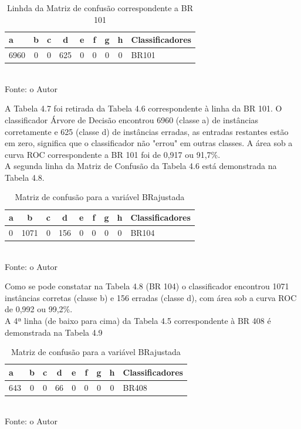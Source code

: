 \begin{table}[!ht]
	\centering
	\caption{Linhda da Matriz de confusão correspondente a BR 101}
	\vspace{1mm}
	\begin{tabular}{l|c|c|c|c|c|c|c|l}
		\hline
		\textbf{a} & \textbf{b} & \textbf{c} & \textbf{d} & \textbf{e} & \textbf{f} & \textbf{g} & \textbf{h} & \textbf{Classificadores}\\
		\hline
		6960 & 0 & 0 & 625 & 0 & 0 & 0 & 0 & BR101 \\
	\end{tabular}
	\\
	\tiny Fonte: o Autor
\end{table}

A Tabela 4.7 foi retirada da Tabela 4.6 correspondente à linha da BR 101. O classificador Árvore de Decisão encontrou 6960 (classe a) de instâncias corretamente e 625 (classe d) de instâncias erradas, as entradas restantes estão em zero, significa que o classificador não "errou" em outras classes. A área sob a curva ROC correspondente a BR 101 foi de 0,917 ou 91,7\%. \\

A segunda linha da Matriz de Confusão da Tabela 4.6 está demonstrada na Tabela 4.8.
 
\begin{table}[!ht]
	\centering
	\caption{Matriz de confusão para a variável BRajustada}
	\vspace{1mm}
	\begin{tabular}{l|c|c|c|c|c|c|c|l}
		\hline
		\textbf{a} & \textbf{b} & \textbf{c} & \textbf{d} & \textbf{e} & \textbf{f} & \textbf{g} & \textbf{h} & \textbf{Classificadores}\\
		\hline
		0 & 1071 & 0 & 156 & 0 & 0 & 0 & 0  & BR104 \\
	\end{tabular}
	\\
	\tiny Fonte: o Autor
\end{table} 
 
Como se pode constatar na Tabela 4.8 (BR 104) o classificador encontrou 1071 instâncias corretas (classe b)  e 156 erradas (classe d), com área sob a curva ROC de 0,992 ou 99,2\%.\\

A 4ª linha (de baixo para cima) da Tabela 4.5 correspondente à BR 408 é demonstrada na Tabela 4.9 

\begin{table}[!ht]
	\centering
	\caption{Matriz de confusão para a variável BRajustada}
	\vspace{1mm}
	\begin{tabular}{l|c|c|c|c|c|c|c|l}
		\hline
		\textbf{a} & \textbf{b} & \textbf{c} & \textbf{d} & \textbf{e} & \textbf{f} & \textbf{g} & \textbf{h} & \textbf{Classificadores}\\
		\hline
		643 & 0 & 0 & 66 & 0 & 0 & 0 & 0  & BR408 \\
	\end{tabular}
	\\
	\tiny Fonte: o Autor
\end{table} 

